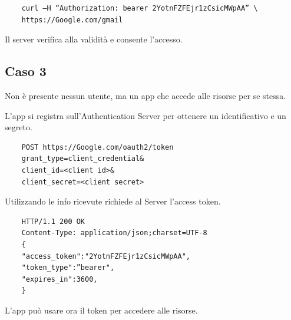 \begin{lstlisting}
    curl –H “Authorization: bearer 2YotnFZFEjr1zCsicMWpAA” \  
    https://Google.com/gmail
\end{lstlisting}

\noindent Il server verifica alla validità e consente l'accesso.

\subsection{Caso 3}
Non è presente nessun utente, ma un app che accede alle risorse per se stessa.

L'app si registra sull'Authentication Server per ottenere un identificativo e un segreto.

\begin{lstlisting}
    POST https://Google.com/oauth2/token  
    grant_type=client_credential&  
    client_id=<client id>&  
    client_secret=<client secret>
\end{lstlisting}

\noindent Utilizzando le info ricevute richiede al Server l'access token.

\begin{lstlisting}
    HTTP/1.1 200 OK  
    Content-Type: application/json;charset=UTF-8  
    {  
    "access_token":"2YotnFZFEjr1zCsicMWpAA",  
    "token_type":”bearer",  
    "expires_in":3600,  
    }
\end{lstlisting}
 
\noindent  L'app può usare ora il token per accedere alle risorse.
 
 